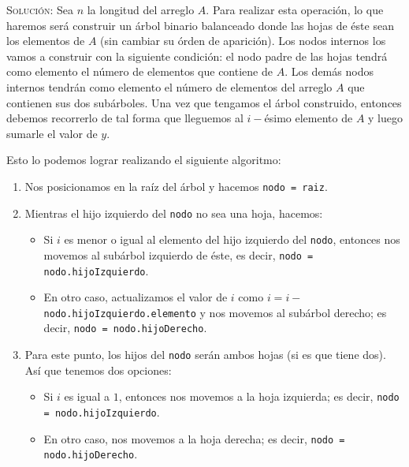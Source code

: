 \documentclass[letterpaper,11pt]{article}
\begin{document}
\begin{enumerate}
\begin{itemize}
        \textsc{Solución:} Sea $n$ la longitud del arreglo $A$. Para realizar 
        esta operación, lo que haremos será construir un árbol binario
        balanceado donde las hojas de éste sean los elementos de $A$ (sin 
        cambiar su órden de aparición). Los nodos internos los vamos a 
        construir con la siguiente condición: el nodo padre de las hojas 
        tendrá como elemento el número de elementos que contiene de $A$. 
        Los demás nodos internos tendrán como elemento el número de elementos 
        del arreglo $A$ que contienen sus dos subárboles. Una vez que tengamos 
        el árbol construido, entonces debemos recorrerlo de tal forma que 
        lleguemos al $i-$ésimo elemento de $A$ y luego sumarle el valor de $y$.

        Esto lo podemos lograr realizando el siguiente algoritmo:
        \begin{enumerate}
            \item Nos posicionamos en la raíz del árbol y hacemos 
            \texttt{nodo = raiz}. 

            \item Mientras el hijo izquierdo del \texttt{nodo} no sea una 
            hoja, hacemos:
            \begin{itemize}
                \item Si $i$ es menor o igual al elemento del hijo izquierdo 
                del \texttt{nodo}, entonces nos movemos al subárbol izquierdo 
                de éste, es decir, \texttt{nodo = nodo.hijoIzquierdo}.

                \item En otro caso, actualizamos el valor de $i$ como 
                $i = i -$ \texttt{nodo.hijoIzquierdo.elemento} y nos movemos 
                al subárbol derecho; es decir, \texttt{nodo = nodo.hijoDerecho}.
            \end{itemize}

            \item Para este punto, los hijos del \texttt{nodo} serán ambos 
            hojas (si es que tiene dos). Así que tenemos dos opciones:
            \begin{itemize}
                \item Si $i$ es igual a $1$, entonces nos movemos a la 
                hoja izquierda; es decir, \texttt{nodo = nodo.hijoIzquierdo}.

                \item En otro caso, nos movemos a la hoja derecha; es decir, 
                \texttt{nodo = nodo.hijoDerecho}.
            \end{itemize}


\end{enumerate}
\end{itemize}
\end{enumerate}
\end{document}
